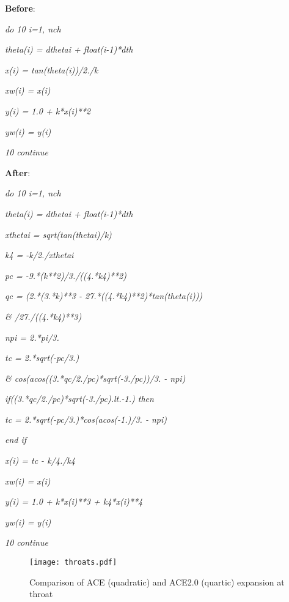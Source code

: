 \begin{singlespace}
    \textbf{Before}:

    \textit{do 10 i=1, nch}

    \textit{\; theta(i) = dthetai + float(i-1)*dth}

    \textit{\; x(i) = tan(theta(i))/2./k}

    \textit{\; xw(i) = x(i)}

    \textit{\; y(i) = 1.0 + k*x(i)**2}

    \textit{\; yw(i) = y(i)}

    \textit{10 continue}

    \textit{ }
    
    \textbf{After}:

    \textit{do 10 i=1, nch }

    \textit{\; theta(i) = dthetai + float(i-1)*dth}

    \textit{\; xthetai = sqrt(tan(thetai)/k)}

    \textit{\; k4 = -k/2./xthetai}

    \textit{\; pc = -9.*(k**2)/3./((4.*k4)**2)}

    \textit{\; qc = (2.*(3.*k)**3 - 27.*((4.*k4)**2)*tan(theta(i)))}

    \textit{\& \quad /27./((4.*k4)**3)}

    \textit{\; npi = 2.*pi/3.}

    \textit{\; tc = 2.*sqrt(-pc/3.)}

    \textit{\& \quad *cos(acos((3.*qc/2./pc)*sqrt(-3./pc))/3. - npi)}

    \textit{\; if((3.*qc/2./pc)*sqrt(-3./pc).lt.-1.) then}

    \textit{\; \qquad tc = 2.*sqrt(-pc/3.)*cos(acos(-1.)/3. - npi)}

    \textit{\; end if}

    \textit{\; x(i) = tc - k/4./k4}

    \textit{\; xw(i) = x(i)}

    \textit{\; y(i) = 1.0 + k*x(i)**3 + k4*x(i)**4}

    \textit{\; yw(i) = y(i)}

    \textit{10 continue}
\end{singlespace}

\begin{figure}[ht!]
    \centering
    \texttt{[image: throats.pdf]}
    \caption{Comparison of ACE (quadratic) and ACE2.0 (quartic) expansion at throat}
    \label{fig:throats}
\end{figure}

